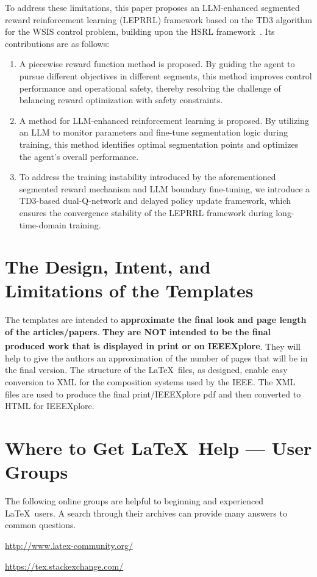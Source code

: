 \documentclass[lettersize,journal]{IEEEtran}
\begin{document}
To address these limitations, this paper proposes an LLM-enhanced segmented reward reinforcement learning (LEPRRL) framework based on the TD3 algorithm for the WSIS control problem, building upon the HSRL framework~\cite{ref14}. Its contributions are as follows:

\begin{enumerate}
\item A piecewise reward function method is proposed. By guiding the agent to pursue different objectives in different segments, this method improves control performance and operational safety, thereby resolving the challenge of balancing reward optimization with safety constraints.

\item A method for LLM-enhanced reinforcement learning is proposed. By utilizing an LLM to monitor parameters and fine-tune segmentation logic during training, this method identifies optimal segmentation points and optimizes the agent's overall performance.

\item To address the training instability introduced by the aforementioned segmented reward mechanism and LLM boundary fine-tuning, we introduce a TD3-based dual-Q-network and delayed policy update framework, which ensures the convergence stability of the LEPRRL framework during long-time-domain training.
\end{enumerate}

\section{The Design, Intent, and \\ Limitations of the Templates}
The templates are intended to {\bf{approximate the final look and page length of the articles/papers}}. {\bf{They are NOT intended to be the final produced work that is displayed in print or on IEEEXplore\textsuperscript{\textregistered}}}. They will help to give the authors an approximation of the number of pages that will be in the final version. The structure of the \LaTeX\ files, as designed, enable easy conversion to XML for the composition systems used by the IEEE. The XML files are used to produce the final print/IEEEXplore pdf and then converted to HTML for IEEEXplore.

\section{Where to Get \LaTeX \ Help --- User Groups}
The following online groups are helpful to beginning and experienced \LaTeX\ users. A search through their archives can provide many answers to common questions.
\begin{list}{}{}
\item{\url{http://www.latex-community.org/}} 
\item{\url{https://tex.stackexchange.com/} }
\end{list}
\end{document}

